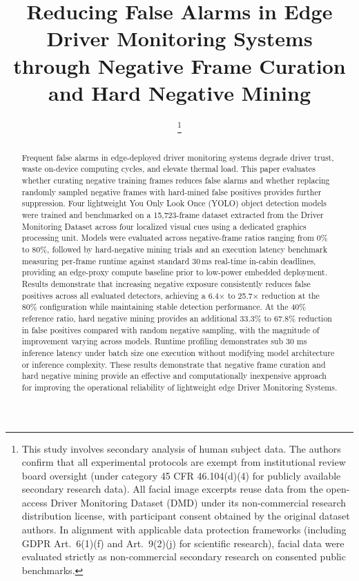 \documentclass[conference]{IEEEtran}
\begin{document}
\title{Reducing False Alarms in Edge Driver Monitoring Systems through Negative Frame Curation and Hard Negative Mining}

\author{
\thanks{This study involves secondary analysis of human subject data. The authors confirm that all experimental protocols are exempt from institutional review board oversight (under category 45 CFR 46.104(d)(4) for publicly available secondary research data). All facial image excerpts reuse data from the open-access Driver Monitoring Dataset (DMD) under its non-commercial research distribution license, with participant consent obtained by the original dataset authors. In alignment with applicable data protection frameworks (including GDPR Art.~6(1)(f) and Art.~9(2)(j) for scientific research), facial data were evaluated strictly as non-commercial secondary research on consented public benchmarks.}}

\maketitle

\begin{abstract}
Frequent false alarms in edge-deployed driver monitoring systems degrade driver trust, waste on-device computing cycles, and elevate thermal load. This paper evaluates whether curating negative training frames reduces false alarms and whether replacing randomly sampled negative frames with hard-mined false positives provides further suppression. Four lightweight You Only Look Once (YOLO) object detection models were trained and benchmarked on a 15,723-frame dataset extracted from the Driver Monitoring Dataset across four localized visual cues using a dedicated graphics processing unit. Models were evaluated across negative-frame ratios ranging from 0\% to 80\%, followed by hard-negative mining trials and an execution latency benchmark measuring per-frame runtime against standard 30\,ms real-time in-cabin deadlines, providing an edge-proxy compute baseline prior to low-power embedded deployment. Results demonstrate  that increasing negative exposure consistently reduces false positives across all evaluated detectors, achieving a 6.4× to 25.7× reduction at the 80\% configuration while maintaining stable detection performance. At the 40\% reference ratio, hard negative mining provides an additional 33.3\% to 67.8\% reduction in false positives compared with random negative sampling, with the magnitude of improvement varying across models. Runtime profiling demonstrates sub 30 ms inference latency under batch size one execution without modifying model architecture or inference complexity. These results demonstrate that negative frame curation and hard negative mining provide an effective and computationally inexpensive approach for improving the operational reliability of lightweight edge Driver Monitoring Systems.
\end{abstract}  
\end{document}
